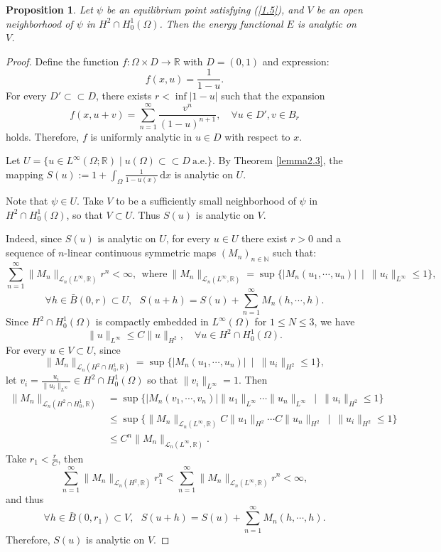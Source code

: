 \documentclass{article}
\numberwithin{equation}{section}
\newtheorem{proposition}[theorem]{Proposition}
\begin{document}
\begin{proposition}
    Let $\psi$ be an equilibrium point satisfying (\ref{1.5}), and $V$ be an open neighborhood of $\psi$ in $H^2\cap H_0^1(\Omega)$. Then the energy functional $E$ is analytic on $V$.
\end{proposition}

\begin{proof}
    Define the function $f:\Omega\times D\to\mathbb{R}$ with $D=(0,1)$ and expression:
    $$f(x,u)=\frac{1}{1-u}.$$
    For every $D'\subset\subset D$, there exists $r<\inf |1-u|$ such that the expansion
    $$f(x,u+v)=\sum_{n=1}^{\infty}\frac{v^n}{(1-u)^{n+1}},\quad \forall u\in D',v\in B_r$$
    holds. Therefore, $f$ is uniformly analytic in $u\in D$ with respect to $x$.

    Let $U=\{u\in L^{\infty}(\Omega;\mathbb{R})\mid u(\Omega)\subset\subset D\ \mathrm{a.e.}\}$. By Theorem \ref{lemma2.3}, the mapping $S(u):=1+\int_{\Omega}\frac{1}{1-u(x)}\,\mathrm{d}x$ is analytic on $U$.

    Note that $\psi\in U$. Take $V$ to be a sufficiently small neighborhood of $\psi$ in $H^2\cap H_0^1(\Omega)$, so that $V\subset U$. Thus $S(u)$ is analytic on $V$.

    Indeed, since $S(u)$ is analytic on $U$, for every $u\in U$ there exist $r>0$ and a sequence of $n$-linear continuous symmetric maps $(M_n)_{n\in \mathbb{N}}$ such that:
    $$\sum_{n=1}^{\infty}\|M_n\|_{\mathcal{L}_n(L^{\infty},\mathbb{R})}r^n<\infty,\ \ \text{where}\ \|M_n\|_{\mathcal{L}_n(L^{\infty},\mathbb{R})}=\sup\{|M_n(u_1,\cdots,u_n)|\ \mid\ \|u_i\|_{L^{\infty}}\le1\},$$
    $$\forall h\in\bar{B}(0,r)\subset U,\ \ \ S(u+h)=S(u)+\sum_{n=1}^{\infty}M_n(h,\cdots,h).$$
    Since $H^2\cap H_0^1(\Omega)$ is compactly embedded in $L^\infty(\Omega)$ for $1\le N\le 3$, we have
    $$\|u\|_{L^{\infty}}\le C\|u\|_{H^2},\quad \forall u\in H^2\cap H_0^1(\Omega).$$
    For every $u\in V\subset U$, since
    $$\|M_n\|_{\mathcal{L}_n(H^2\cap H_0^1,\mathbb{R})}=\sup\{|M_n(u_1,\cdots,u_n)|\ \mid\ \|u_i\|_{H^2}\le1\},$$
    let $v_i=\frac{u_i}{\|u_i\|_{L^{\infty}}}\in H^2\cap H_0^1(\Omega)$ so that $\|v_i\|_{L^{\infty}}=1$. Then
    \begin{align*}
        \|M_n\|_{\mathcal{L}_n(H^2\cap H_0^1,\mathbb{R})}&=\sup\{|M_n(v_1,\cdots,v_n)|\|u_1\|_{L^{\infty}}\cdots\|u_n\|_{L^{\infty}}\ \mid\ \|u_i\|_{H^2}\le1\}\\
        &\le \sup\{\|M_n\|_{\mathcal{L}_n(L^{\infty},\mathbb{R})}C\|u_1\|_{H^2}\cdots C\|u_n\|_{H^2}\ \mid\ \|u_i\|_{H^2}\le1\}\\
        &\le C^n\|M_n\|_{\mathcal{L}_n(L^{\infty},\mathbb{R})}.
    \end{align*}
    Take $r_1<\frac{r}{C}$, then
    $$\sum_{n=1}^{\infty}\|M_n\|_{\mathcal{L}_n(H^2,\mathbb{R})}r_1^n< \sum_{n=1}^{\infty}\|M_n\|_{\mathcal{L}_n(L^{\infty},\mathbb{R})}r^n<\infty,$$
    and thus
    $$\forall h\in\bar{B}(0,r_1)\subset V,\ \ \ S(u+h)=S(u)+\sum_{n=1}^{\infty}M_n(h,\cdots,h).$$
    Therefore, $S(u)$ is analytic on $V$.


\end{proof}
\end{document}
